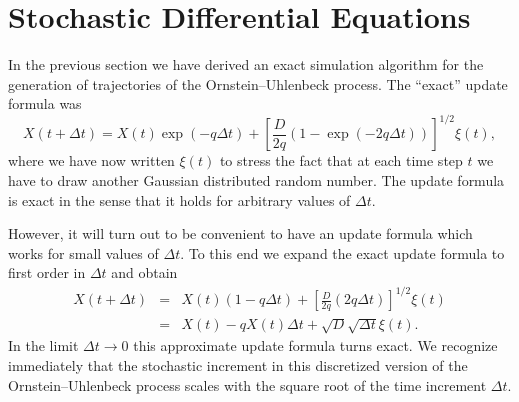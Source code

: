 \chapter{Stochastic Differential Equations}

In the previous section we have derived an exact simulation algorithm
for the generation of trajectories of the Ornstein--Uhlenbeck process.
The ``exact'' update formula was
\begin{equation*}
X(t+\Delta t) = X(t) \exp(-q \Delta t) +
  \left[ \frac{D}{2q}(1-\exp(-2q\Delta t)) \right]^{1/2} \xi(t),
\end{equation*}
where we have now written $\xi(t)$ to stress the fact that at each
time step $t$ we have to draw another Gaussian distributed random 
number. The update formula is exact in the sense that it holds for
arbitrary values of $\Delta t$.

However, it will turn out to be convenient to have an update formula
which works for small values of $\Delta t$. To this end we expand the
exact update formula to first order in $\Delta t$ and obtain
\begin{eqnarray}
X(t+\Delta t)& =& X(t) (1- q \Delta t) + 
   \left[ \frac{D}{2q} (2q \Delta t) \right]^{1/2} \xi(t) \nonumber
   \\
\label{SDE_APPROX} 
  & = & X(t) - qX(t) \Delta t + \sqrt{D} \sqrt{\Delta t} \xi(t).
\end{eqnarray}
In the limit $\Delta t \rightarrow 0$ this approximate update formula
turns exact.  We recognize immediately that the stochastic increment in
this discretized version of the Ornstein--Uhlenbeck process scales
with the square root of the time increment $\Delta t$.

